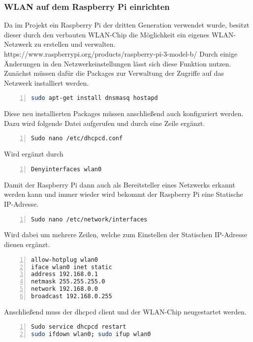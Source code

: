 \subsubsection{\ac{WLAN} auf dem Raspberry Pi einrichten}
Da im Projekt ein Raspberry Pi der dritten Generation verwendet wurde, besitzt dieser durch den verbauten \ac{WLAN}-Chip die Möglichkeit ein eigenes \ac{WLAN}-Netzwerk zu erstellen und verwalten. https://www.raspberrypi.org/products/raspberry-pi-3-model-b/ 
Durch einige Änderungen in den Netzwerkeinstellungen lässt sich diese Funktion nutzen.
Zunächst müssen dafür die Packages zur Verwaltung der Zugriffe auf das Netzwerk installiert werden.
\begin{lstlisting}[caption={Installation dnsmasq hostapd}, language={bash}, numbers=left]
sudo apt-get install dnsmasq hostapd
\end{lstlisting}
Diese neu installierten Packages müssen anschließend auch konfiguriert werden. Dazu wird folgende Datei aufgerufen und durch eine Zeile ergänzt.
\begin{lstlisting}[caption={Konfiguration DHCP Server Schritt 1}, language={bash}, numbers=left]
Sudo nano /etc/dhcpcd.conf
\end{lstlisting}
Wird ergänzt durch
\begin{lstlisting}[caption={Konfiguration DHCP Server Schritt 2}, language={bash}, numbers=left]
Denyinterfaces wlan0
\end{lstlisting}
Damit der Raspberry Pi dann auch als Bereitsteller eines Netzwerks erkannt werden kann und immer wieder wird bekommt der Raspberry Pi eine Statische \ac{IP}-Adresse. 
\begin{lstlisting}[caption={Konfiguration Interfaces Schritt 1}, language={bash}, numbers=left]
Sudo nano /etc/network/interfaces
\end{lstlisting}
Wird dabei um mehrere Zeilen, welche zum Einstellen der Statischen \ac{IP}-Adresse dienen ergänzt.
\begin{lstlisting}[caption={Konfiguration Interfaces Schritt 2}, language={bash}, numbers=left]
allow-hotplug wlan0
iface wlan0 inet static
address 192.168.0.1
netmask 255.255.255.0
network 192.168.0.0
broadcast 192.168.0.255
\end{lstlisting}
Anschließend muss der dhcpcd client und der \ac{WLAN}-Chip neugestartet werden.
\begin{lstlisting}[caption={Konfiguration Interfaces Schritt 3}, language={bash}, numbers=left] 
Sudo service dhcpcd restart
sudo ifdown wlan0; sudo ifup wlan0
\end{lstlisting}
